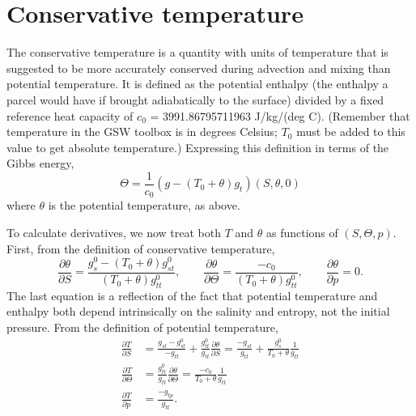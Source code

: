 \documentclass{article}
\begin{document}
\section{Conservative temperature}

The conservative temperature is a quantity with units of temperature that is suggested to be more accurately conserved during advection and mixing than potential temperature. It is defined as the potential enthalpy (the enthalpy a parcel would have if brought adiabatically to the surface) divided by a fixed reference heat capacity of $c_0$ = 3991.86795711963 J/kg/(deg C). (Remember that temperature in the GSW toolbox is in degrees Celsius; $T_0$ must be added to this value to get absolute temperature.) Expressing this definition in terms of the Gibbs energy,
\begin{equation}\label{eqn:contemp}
    \Theta = \frac{1}{c_0} \left( g - (T_0 + \theta) g_t \right)(S,\theta,0)
\end{equation}
where $\theta$ is the potential temperature, as above.

To calculate derivatives, we now treat both $T$ and $\theta$ as functions of $(S,\Theta,p)$. First, from the definition of conservative temperature,
\begin{equation*}
    \frac{\partial \theta}{\partial S} = \frac{g^0_s - (T_0 + \theta) g^0_{st}}{(T_0 + \theta) g^0_{tt}}, \qquad \frac{\partial \theta}{\partial \Theta} = \frac{-c_0}{(T_0 + \theta) g^0_{tt}}, \qquad \frac{\partial \theta}{\partial p} = 0.
\end{equation*}
The last equation is a reflection of the fact that potential temperature and enthalpy both depend intrinsically on the salinity and entropy, not the initial pressure. From the definition of potential temperature,
\begin{align*}
    \frac{\partial T}{\partial S} &= \frac{g_{st}-g^0_{st}}{-g_{tt}} + \frac{g^0_{tt}}{g_{tt}} \frac{\partial \theta}{\partial S} = \frac{-g_{st}}{g_{tt}} + \frac{g^0_s}{T_0 + \theta} \frac{1}{g_{tt}} \\
    \frac{\partial T}{\partial \Theta} &= \frac{g^0_{tt}}{g_{tt}} \frac{\partial \theta}{\partial \Theta} = \frac{-c_0}{T_0 + \theta} \frac{1}{g_{tt}} \\
    \frac{\partial T}{\partial p} &= \frac{-g_{tp}}{g_{tt}}.
\end{align*}
\end{document}
